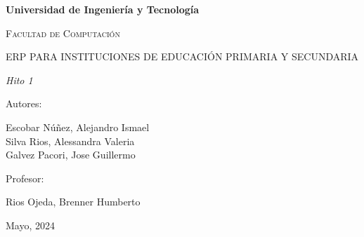 \begin{titlepage}
	\centering
	{\bfseries\LARGE Universidad de Ingeniería y Tecnología \par}
	\vspace{1cm}
	{\scshape\Large Facultad de Computación \par}
	\vspace{2cm}
	{\scshape\Huge ERP PARA INSTITUCIONES DE EDUCACIÓN PRIMARIA Y SECUNDARIA \par}
	\vspace{2cm}
	{\itshape\Large Hito 1 \par}
	\vfill
	{\Large Autores: \par}
	{\Large Escobar Núñez, Alejandro Ismael \\
		Silva Rios, Alessandra Valeria \\
		Galvez Pacori, Jose Guillermo \par}
	\vfill
	{\Large Profesor: \par}
	{\Large Rios Ojeda, Brenner Humberto \par}
	\vfill
	{\Large Mayo, 2024 \par}
\end{titlepage}